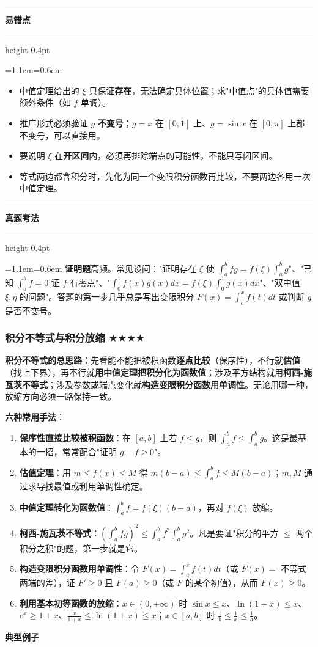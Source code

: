 \documentclass[11pt,openany,UTF8]{ctexbook}
\newcommand{\callouthead}[2]{%
  \par\addvspace{7pt}\noindent
  {\color{#1}\rule[-0.15em]{3pt}{1.05em}}\hspace{0.5em}%
  {\bfseries\color{#1}#2}\par\nobreak\vspace{-0.35em}%
  {\color{rulesep}\hrule height 0.4pt}\nobreak\vspace{0.45em}%
  \begingroup\small\setlength{\parindent}{0pt}%
  \leftskip=1.1em\rightskip=0.6em\noindent\ignorespaces}
\newcommand{\calloutend}{\par\endgroup\addvspace{7pt}}
\newenvironment{callwarn}[1]{\callouthead{warnbar}{#1}}{\calloutend}
\newenvironment{callexam}[1]{\callouthead{exambar}{#1}}{\calloutend}
\begin{document}
\begin{callwarn}{易错点}
\begin{itemize}
\item 中值定理给出的 $\xi$ 只保证\textbf{存在}，无法确定具体位置；求"中值点"的具体值需要额外条件（如 $f$ 单调）。
\item 推广形式必须验证 $g$ \textbf{不变号}；$g=x$ 在 $[0,1]$ 上、$g=\sin x$ 在 $[0,\pi]$ 上都不变号，可以直接用。
\item 要说明 $\xi$ 在\textbf{开区间}内，必须再排除端点的可能性，不能只写闭区间。
\item 等式两边都含积分时，先化为同一个变限积分函数再比较，不要两边各用一次中值定理。
\end{itemize}
\end{callwarn}

\begin{callexam}{真题考法}
\textbf{证明题}高频。常见设问："证明存在 $\xi$ 使 $\int_a^bfg=f(\xi)\int_a^bg$"、"已知 $\int_a^bf=0$ 证 $f$ 有零点"、"$\int_0^1f(x)g(x)dx=f(\xi)\int_0^1g(x)dx$"、"双中值 $\xi,\eta$ 的问题"。答题的第一步几乎总是写出变限积分 $F(x)=\int_a^xf(t)dt$ 或判断 $g$ 是否不变号。

\end{callexam}

\subsubsection{积分不等式与积分放缩 $\bigstar$$\bigstar$$\bigstar$$\bigstar$}

\textbf{积分不等式的总思路}：先看能不能把被积函数\textbf{逐点比较}（保序性），不行就\textbf{估值}（找上下界），再不行就\textbf{用中值定理把积分化为函数值}；涉及平方结构就用\textbf{柯西-施瓦茨不等式}；涉及参数或端点变化就\textbf{构造变限积分函数用单调性}。无论用哪一种，放缩方向必须一路保持一致。

\textbf{六种常用手法}：

\begin{enumerate}
\item \textbf{保序性直接比较被积函数}：在 $[a,b]$ 上若 $f\leq g$，则 $\int_a^bf\leq\int_a^bg$。这是最基本的一招，常常配合"证明 $g-f\geq0$"。
\item \textbf{估值定理}：用 $m\leq f(x)\leq M$ 得 $m(b-a)\leq\int_a^bf\leq M(b-a)$；$m,M$ 通过求导找最值或利用单调性确定。
\item \textbf{中值定理转化为函数值}：$\int_a^bf=f(\xi)(b-a)$，再对 $f(\xi)$ 放缩。
\item \textbf{柯西-施瓦茨不等式}：$\left(\int_a^bfg\right)^2\leq\int_a^bf^2\int_a^bg^2$。凡是要证"积分的平方 $\leq$ 两个积分之积"的题，第一步就是它。
\item \textbf{构造变限积分函数用单调性}：令 $F(x)=\int_a^xf(t)dt$（或 $F(x)=$ 不等式两端的差），证 $F'\geq0$ 且 $F(a)\geq0$（或 $F$ 的某个初值），从而 $F(x)\geq0$。
\item \textbf{利用基本初等函数的放缩}：$x\in(0,+\infty)$ 时 $\sin x\leq x$、$\ln(1+x)\leq x$、$e^x\geq1+x$、$\frac{x}{1+x}\leq\ln(1+x)\leq x$；$x\in[a,b]$ 时 $\frac{1}{b}\leq\frac{1}{x}\leq\frac{1}{a}$。
\end{enumerate}
\textbf{典型例子}
\end{document}
